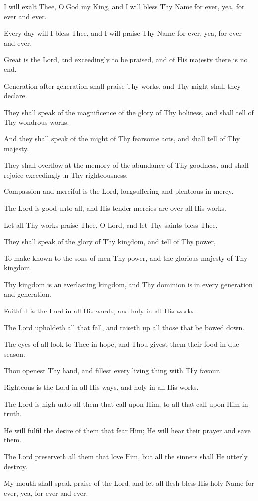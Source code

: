 I will exalt Thee, O God my King, and I will bless Thy Name for ever, yea, for ever and ever.

Every day will I bless Thee, and I will praise Thy Name for ever, yea, for ever and ever.

Great is the Lord, and exceedingly to be praised, and of His majesty there is no end.

Generation after generation shall praise Thy works, and Thy might shall they declare.

They shall speak of the magnificence of the glory of Thy holiness, and shall tell of Thy wondrous works.

And they shall speak of the might of Thy fearsome acts, and shall tell of Thy majesty.

They shall overflow at the memory of the abundance of Thy goodness, and shall rejoice exceedingly in Thy righteousness.

Compassion and merciful is the Lord, longsuffering and plenteous in mercy.

The Lord is good unto all, and His tender mercies are over all His works.

Let all Thy works praise Thee, O Lord, and let Thy saints bless Thee.

They shall speak of the glory of Thy kingdom, and tell of Thy power,

To make known to the sons of men Thy power, and the glorious majesty of Thy kingdom.

Thy kingdom is an everlasting kingdom, and Thy dominion is in every generation and generation.

Faithful is the Lord in all His words, and holy in all His works.

The Lord upholdeth all that fall, and raiseth up all those that be bowed down.
 
The eyes of all look to Thee in hope, and Thou givest them their food in due season.

Thou openest Thy hand, and fillest every living thing with Thy favour.

Righteous is the Lord in all His ways, and holy in all His works.

The Lord is nigh unto all them that call upon Him, to all that call upon Him in truth.

He will fulfil the desire of them that fear Him; He will hear their prayer and save them.

The Lord preserveth all them that love Him, but all the sinners shall He utterly destroy.

My mouth shall speak praise of the Lord, and let all flesh bless His holy Name for ever, yea, for ever and ever.
